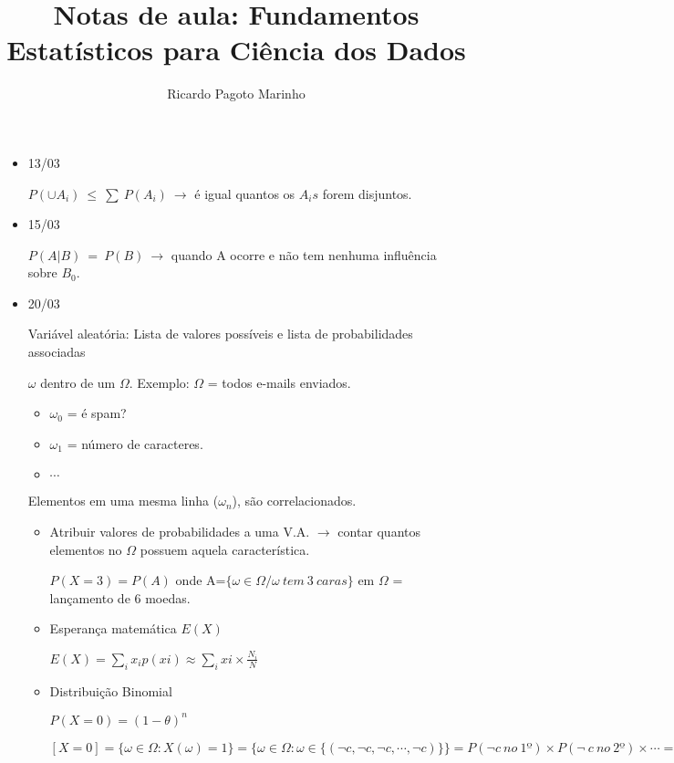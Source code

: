 \documentclass[11pt,a4paper]{book}
\title{Notas de aula: Fundamentos Estatísticos para Ciência dos Dados}
\author{Ricardo Pagoto Marinho}
\begin{document}
\maketitle
	\begin{itemize}
		\item 13/03
		
		$P(\cup A_i)~\leq~\sum~P(A_i)~\rightarrow$ é igual quantos os $A_is$ forem disjuntos.
		
		\item 15/03
		
		$P(A|B)~=~P(B)~\rightarrow$ quando A ocorre e não tem nenhuma influência sobre $B_0$.
		
		\item 20/03
		
		Variável aleatória: Lista de valores possíveis e lista de probabilidades associadas
		
		$\omega$ dentro de um $\Omega$.
		Exemplo: $\Omega$ = todos e-mails enviados.
		\begin{itemize}
			\item $\omega_0$ = é spam?
			\item $\omega_1$ = número de caracteres.
			\item $\cdots$
		\end{itemize}
		Elementos em uma mesma linha ($\omega_n$), são correlacionados. 
		
		\begin{itemize}
			\item Atribuir valores de probabilidades a uma V.A. $\rightarrow$ contar quantos elementos no $\Omega$ possuem aquela característica.
			
			$P(X=3) = P(A)$ onde A=$\lbrace \omega \in \Omega / \omega~tem~3~caras \rbrace$ em $\Omega$ = lançamento de 6 moedas.
			\item Esperança matemática $E(X)$
			
			$E(X)= \sum_i x_ip(xi) \approx \sum_i xi\times \frac{N_i}{N}$
			
			\item Distribuição Binomial
			
			$P(X=0) = (1-\theta)^{n}$
			
			$[X=0]=\lbrace\omega \in \Omega:X(\omega)=1\rbrace=\lbrace\omega \in \Omega: \omega \in \lbrace(\neg c,\neg c,\neg c,\cdots,\neg c)\rbrace\rbrace=P(\neg c~no~1º)\times P(\neg~c~no~2º)\times \cdots = (1-\theta)\times(1-\theta)\cdots = (1-\theta)^{n}$
			
		\end{itemize}
	\end{itemize}
\end{document}

